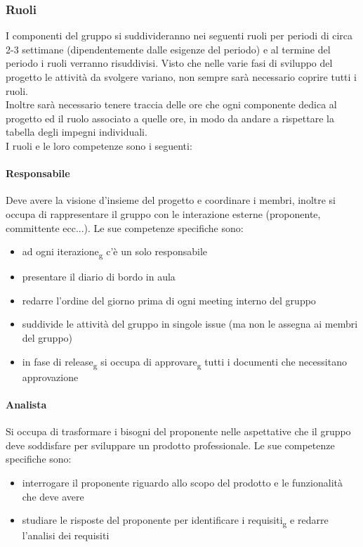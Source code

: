 \subsubsection{Ruoli}
I componenti del gruppo si suddivideranno nei seguenti ruoli per periodi di circa 2-3 settimane (dipendentemente dalle esigenze del periodo) e al termine del periodo i ruoli verranno risuddivisi. 
Visto che nelle varie fasi di sviluppo del progetto le attività da svolgere variano, non sempre sarà necessario coprire tutti i ruoli.\\
Inoltre sarà necessario tenere traccia delle ore che ogni componente dedica al progetto ed il ruolo associato a quelle ore, in modo da andare a rispettare la tabella degli impegni individuali.\\
I ruoli e le loro competenze sono i seguenti:

\paragraph{Responsabile}
Deve avere la visione d'insieme del progetto e coordinare i membri, inoltre si occupa di rappresentare il gruppo con le interazione esterne (proponente, committente ecc...). Le sue competenze specifiche sono:
\begin{itemize}
	\item ad ogni iterazione\textsubscript{g} c'è un solo responsabile
	\item presentare il diario di bordo in aula
	\item redarre l'ordine del giorno prima di ogni meeting interno del gruppo
	\item suddivide le attività del gruppo in singole issue (ma non le assegna ai membri del gruppo)
	\item in fase di release\textsubscript{g} si occupa di approvare\textsubscript{g} tutti i documenti che necessitano approvazione
\end{itemize}

\paragraph{Analista}
Si occupa di trasformare i bisogni del proponente nelle aspettative che il gruppo deve soddisfare per sviluppare un prodotto professionale. Le sue competenze specifiche sono:
\begin{itemize}
	\item interrogare il proponente riguardo allo scopo del prodotto e le funzionalità che deve avere
	\item studiare le risposte del proponente per identificare i requisiti\textsubscript{g} e redarre l'analisi dei requisiti
\end{itemize}


